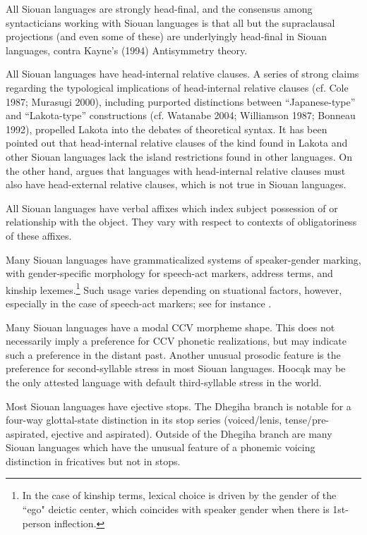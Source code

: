 \begin{refsection}
All Siouan languages are strongly head-final, and the consensus among syntacticians working with Siouan languages is that all but the supraclausal projections (and even some of these) are underlyingly head-final in Siouan languages, contra Kayne's (1994) Antisymmetry theory.


All Siouan languages have head-internal relative clauses. A series of strong claims regarding the typological implications of head-internal relative clauses (cf. Cole 1987; Murasugi 2000), including purported distinctions between ``Japanese-type'' and ``Lakota-type'' constructions (cf. Watanabe 2004; Williamson 1987; Bonneau 1992), propelled Lakota into the debates of theoretical syntax. It has been pointed out that head-internal relative clauses of the kind found in Lakota and other Siouan languages lack the island restrictions found in other languages. On the other hand, \citet{Murasugi2000} argues that languages with head-internal relative clauses must also have head-external relative clauses, which is not true in Siouan languages.


All Siouan languages have verbal affixes which index subject possession of or relationship with the object. They vary with respect to contexts of obligatoriness of these affixes.


Many Siouan languages have grammaticalized systems of speaker-gender marking, with gender-specific morphology for speech-act markers, address terms, and kinship lexemes.\footnote{In the case of kinship terms, lexical choice is driven by the gender of the ``ego" deictic center, which coincides with speaker gender when there is 1st-person inflection.} Such usage varies depending on stuational factors, however, especially in the case of speech-act markers; see for instance \citet{Trechter1995}.   


Many Siouan languages have a modal CCV morpheme shape. This does not necessarily imply a preference for CCV phonetic realizations, but may indicate such a preference in the distant past. Another unusual prosodic feature is the preference for second-syllable stress in most Siouan languages. Hooc\k{a}k may be the only attested language with default third-syllable stress in the world.


Most Siouan languages have ejective stops. The Dhegiha branch is notable for a four-way glottal-state distinction in its stop series (voiced/lenis, tense/pre-aspirated, ejective and aspirated). Outside of the Dhegiha branch are many Siouan languages which have the unusual feature of a phonemic voicing distinction in fricatives but not in stops.



\end{refsection}
